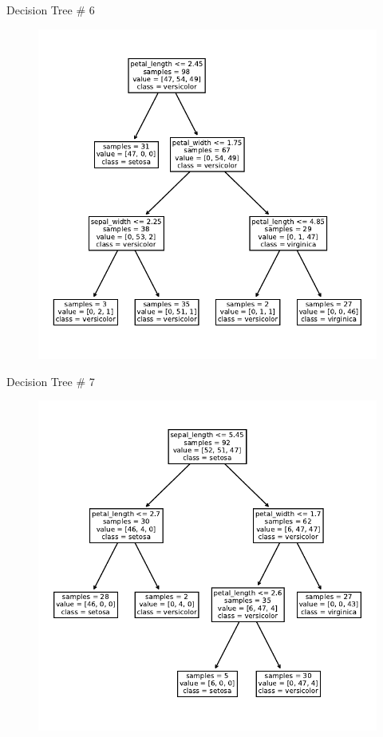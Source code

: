 \documentclass{beamer}
\begin{document}
\begin{frame}{Decision Tree \# 6}
\begin{figure}
\includegraphics[scale=0.7]{tree-6.pdf}
\end{figure}
\end{frame}


\begin{frame}{Decision Tree \# 7}
\begin{figure}
\includegraphics[scale=0.7]{tree-7.pdf}
\end{figure}
\end{frame}
\end{document}
